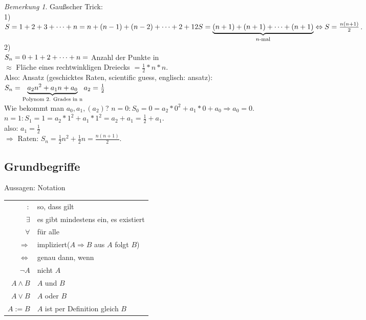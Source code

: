 \documentclass[12pt,a4paper,titlepage]{article} %
\theoremstyle{definition}
\theoremstyle{remark}
\newtheorem*{bem}{Bemerkung}
\begin{document}
\begin{bem}
	Gaußscher Trick:\\
	1)\\
	\(S=1+2+3+\dots+n=n+(n-1)+(n-2)+\dots+2+1\\
	2S = \underbrace{(n+1)+(n+1)+\dots+(n+1)}_{n\text{-mal}} \Leftrightarrow S = 
	\frac{n(n+1)}{2}\).\\
	2)\\
	\(S_n = 0 + 1 + 2 + \dots + n\\=\) Anzahl der Punkte in\\
	\(\approx\) Fläche eines rechtwinkligen Dreiecks \(=\frac{1}{2}*n*n\).\\
	Also: Ansatz (\glqq geschicktes Raten\grqq , \glqq scientific guess\grqq , englisch: ansatz):\\
	\(S_n = \underbrace{a_2 n^2 + a_1 n + a_0}_{\text{Polynom 2. Grades in n}}\\
	a_2 = \frac{1}{2}\)\\
	Wie bekommt man \(a_0, a_1, (a_2)\)?
	\(n=0: S_0 = 0 = a_2*0^2+a_1*0+a_0 \Rightarrow a_0 = 0\).\\
	\(n=1: S_1 = 1 = a_2*1^2+a_1*1^2 = a_2 + a_1 = \frac{1}{2} + a_1\).\\
	also: \(a_1 = \frac{1}{2}\)\\
	\(\Rightarrow\) Raten: \(S_n = \frac{1}{2}n^2 + \frac{1}{2} n = \frac{n(n+1)}{2}\).
\end{bem}

\subsection{Grundbegriffe}
Aussagen: Notation\\
\begin{tabular}{r|l}
	\(:\) & \glqq so, dass gilt\grqq\\
	\(\exists\) & \glqq es gibt mindestens ein\grqq , \glqq es existiert\grqq\\
	\(\forall\) & \glqq für alle\grqq\\
	\(\Rightarrow\) & \glqq impliziert\grqq(\(A \Rightarrow B\) \glqq aus \(A\) folgt \(B\)\grqq)\\
	\(\Leftrightarrow\) & \glqq genau dann, wenn\grqq\\
	\(\neg A\) & nicht \(A\)\\
	\(A \wedge B\) & \(A\) und \(B\)\\
	\(A \vee B\) & \(A\) oder \(B\)\\
	\(A := B\) & \(A\) ist per Definition gleich \(B\)
\end{tabular}
\end{document}
